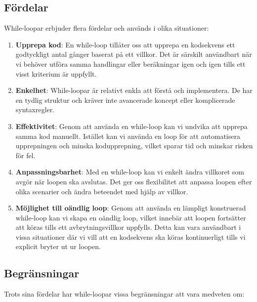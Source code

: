 \hypertarget{fuxf6rdelar}{%
\subsection{Fördelar}\label{fuxf6rdelar}}

While-loopar erbjuder flera fördelar och används i olika situationer:

\begin{enumerate}
\def\labelenumi{\arabic{enumi}.}
\item
  \textbf{Upprepa kod}: En while-loop tillåter oss att upprepa en
  kodsekvens ett godtyckligt antal gånger baserat på ett villkor. Det är
  särskilt användbart när vi behöver utföra samma handlingar eller
  beräkningar igen och igen tills ett visst kriterium är uppfyllt.
\item
  \textbf{Enkelhet}: While-loopar är relativt enkla att förstå och
  implementera. De har en tydlig struktur och kräver inte avancerade
  koncept eller komplicerade syntaxregler.
\item
  \textbf{Effektivitet}: Genom att använda en while-loop kan vi undvika
  att upprepa samma kod manuellt. Istället kan vi använda en loop för
  att automatisera upprepningen och minska kodupprepning, vilket sparar
  tid och minskar risken för fel.
\item
  \textbf{Anpassningsbarhet}: Med en while-loop kan vi enkelt ändra
  villkoret som avgör när loopen ska avslutas. Det ger oss flexibilitet
  att anpassa loopen efter olika scenarier och ändra beteendet med hjälp
  av villkor.
\item
  \textbf{Möjlighet till oändlig loop}: Genom att använda en lämpligt
  konstruerad while-loop kan vi skapa en oändlig loop, vilket innebär
  att loopen fortsätter att köras tills ett avbrytningsvillkor uppfylls.
  Detta kan vara användbart i vissa situationer där vi vill att en
  kodsekvens ska köras kontinuerligt tills vi explicit bryter ut ur
  loopen.
\end{enumerate}

\hypertarget{begruxe4nsningar}{%
\subsection{Begränsningar}\label{begruxe4nsningar}}

Trots sina fördelar har while-loopar vissa begränsningar att vara
medveten om:

